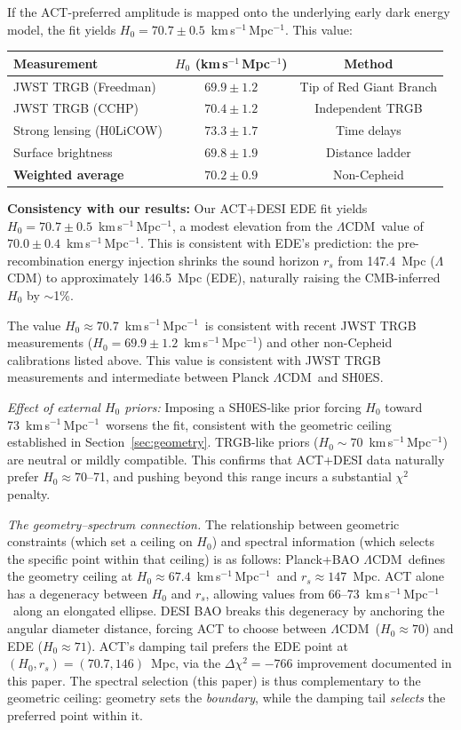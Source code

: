 \documentclass[onecolumn,showpacs,preprintnumbers,amsmath,amssymb,prd]{revtex4-2}
\newcommand{\lcdm}{$\Lambda$CDM}
\newcommand{\kms}{km\,s$^{-1}$\,Mpc$^{-1}$}
\begin{document}
If the ACT-preferred amplitude is mapped onto the underlying early dark 
energy model, the fit yields $H_0 = 70.7 \pm 0.5$~\kms. This value:
\begin{center}
\begin{tabular}{lcc}
\toprule
Measurement & $H_0$ (\kms) & Method \\
\midrule
JWST TRGB (Freedman) & $69.9 \pm 1.2$ & Tip of Red Giant Branch \\
JWST TRGB (CCHP) & $70.4 \pm 1.2$ & Independent TRGB \\
Strong lensing (H0LiCOW) & $73.3 \pm 1.7$ & Time delays \\
Surface brightness & $69.8 \pm 1.9$ & Distance ladder \\
\midrule
\textbf{Weighted average} & $\mathbf{70.2 \pm 0.9}$ & Non-Cepheid \\
\bottomrule
\end{tabular}
\end{center}

\textbf{Consistency with our results:} Our ACT+DESI EDE fit yields 
$H_0 = 70.7 \pm 0.5$~\kms, a modest elevation from the \lcdm\ value of 
$70.0 \pm 0.4$~\kms. This is consistent with EDE's prediction: the 
pre-recombination energy injection shrinks the sound horizon 
$r_s$ from 147.4~Mpc (\lcdm) to approximately 146.5~Mpc (EDE), 
naturally raising the CMB-inferred $H_0$ by $\sim$1\%.

The value $H_0 \approx 70.7$~\kms\ is consistent with recent 
JWST TRGB measurements ($H_0 = 69.9 \pm 1.2$~\kms) and other non-Cepheid 
calibrations listed above. This value is consistent with JWST TRGB measurements and intermediate 
between Planck \lcdm\ and SH0ES.

\emph{Effect of external $H_0$ priors:} Imposing a SH0ES-like prior forcing 
$H_0$ toward 73~\kms\ worsens the fit, consistent with the geometric ceiling 
established in Section~\ref{sec:geometry}. TRGB-like priors ($H_0 \sim 70$~\kms) 
are neutral or mildly compatible. This confirms that ACT+DESI data naturally prefer $H_0 \approx 70$--71, 
and pushing beyond this range incurs a substantial $\chi^2$ penalty.

\emph{The geometry--spectrum connection.}
The relationship between geometric constraints (which set a ceiling 
on $H_0$) and spectral information (which selects the specific point within 
that ceiling) is as follows:
Planck+BAO \lcdm\ defines the geometry ceiling at $H_0 \approx 67.4$~\kms\ and $r_s \approx 147$~Mpc. ACT alone has a degeneracy between $H_0$ and $r_s$, allowing values from 66--73~\kms\ along an elongated ellipse. DESI BAO breaks this degeneracy by anchoring the angular diameter distance, forcing ACT to choose between \lcdm\ ($H_0 \approx 70$) and EDE ($H_0 \approx 71$). ACT's damping tail prefers the EDE point at $(H_0, r_s) = (70.7, 146)$~Mpc, via the $\Delta\chi^2 = -766$ improvement documented in this paper.
The spectral selection (this paper) is thus complementary to the geometric 
ceiling: geometry sets the \emph{boundary}, while the damping tail 
\emph{selects} the preferred point within it.
\end{document}
